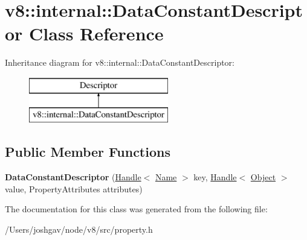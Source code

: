 \hypertarget{classv8_1_1internal_1_1_data_constant_descriptor}{}\section{v8\+:\+:internal\+:\+:Data\+Constant\+Descriptor Class Reference}
\label{classv8_1_1internal_1_1_data_constant_descriptor}
Inheritance diagram for v8\+:\+:internal\+:\+:Data\+Constant\+Descriptor\+:\begin{figure}[H]
\begin{center}
\leavevmode
\includegraphics[height=2.000000cm]{classv8_1_1internal_1_1_data_constant_descriptor}
\end{center}
\end{figure}
\subsection*{Public Member Functions}
\begin{DoxyCompactItemize}
\item 
{\bfseries Data\+Constant\+Descriptor} (\hyperlink{classv8_1_1internal_1_1_handle}{Handle}$<$ \hyperlink{classv8_1_1internal_1_1_name}{Name} $>$ key, \hyperlink{classv8_1_1internal_1_1_handle}{Handle}$<$ \hyperlink{classv8_1_1internal_1_1_object}{Object} $>$ value, Property\+Attributes attributes)\hypertarget{classv8_1_1internal_1_1_data_constant_descriptor_a64f15e9ea18e335bb8066b173f298d73}{}\label{classv8_1_1internal_1_1_data_constant_descriptor_a64f15e9ea18e335bb8066b173f298d73}

\end{DoxyCompactItemize}


The documentation for this class was generated from the following file\+:\begin{DoxyCompactItemize}
\item 
/\+Users/joshgav/node/v8/src/property.\+h\end{DoxyCompactItemize}
